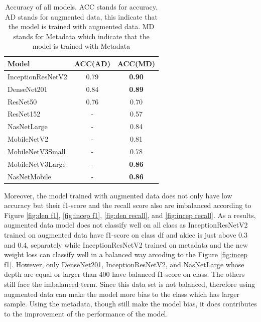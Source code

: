 \documentclass[sensors,article,submit,pdftex,moreauthors]{Definitions/mdpi}
\begin{document}
\begin{table}[H]
	\centering
	\begin{tabular}{| l | c  c | }
		\hline
		Model & ACC(AD) & ACC(MD)\\ 
		\hline
		InceptionResNetV2 & 0.79 & \textbf{0.90}\\
		\hline
		DenseNet201 & 0.84 & \textbf{0.89}\\
		\hline
		ResNet50 & 0.76 & 0.70 \\
		\hline
		ResNet152 & - & 0.57\\
		\hline
		NasNetLarge & - & 0.84\\
		\hline
		MobileNetV2 & - & 0.81\\
		\hline
		MobileNetV3Small & - & 0.78\\
		\hline
		MobileNetV3Large & - & \textbf{0.86}\\
		\hline
		NasNetMobile & - & \textbf{0.86}\\
		\hline
	\end{tabular}
	\caption{Accuracy of all models. ACC stands for accuracy. AD stands for augmented data, this indicate that the model is trained with augmented data. MD stands for Metadata which indicate that the model is trained with Metadata}
	\label{table:overall-acc}
\end{table}

Moreover, the model trained with augmented data does not only have low accuracy but their f1-score and the recall score also are imbalanced according to Figure \ref{fig:den f1}, \ref{fig:incep f1}, \ref{fig:den recall}, and \ref{fig:incep recall}. As a results, augmented data model does not classify well on all class as InceptionResNetV2 trained on augmented data have f1-score on class df and akiec is just above $0.3$ and $0.4$, separately while InceptionResNetV2 trained on metadata and the new weight loss can classify well in a balanced way arcoding to the Figure \ref{fig:incep f1}. However, only DenseNet201, InceptionResNetV2, and NasNetLarge whose depth are equal or larger than 400 have balanced f1-score on class. The others still face the imbalanced term. Since this data set is not balanced, therefore using augmented data can make the model more  bias to the class which has larger sample. Using the metadata, though still make the model bias, it does contributes to the improvement of  the performance of the model.
\end{document}
